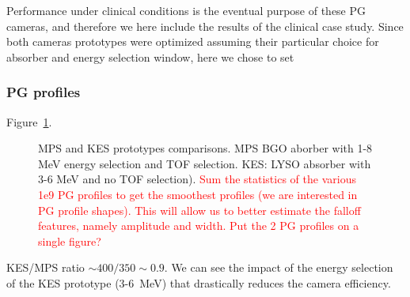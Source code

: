 \documentclass[a4paper,english]{article}
\begin{document}
Performance under clinical conditions is the eventual purpose of these PG cameras, and therefore we here include the results of the clinical case study. Since both cameras prototypes were optimized assuming their particular choice for absorber and energy selection window, here we chose to set 

\subsubsection{PG profiles}

Figure~\ref{PGprofileProtoComp}.

\begin{figure}[!htp]
  \centering
  \quad
  \caption{\label{PGprofileProtoComp} MPS and KES prototypes comparisons. MPS BGO aborber with 1-8 MeV energy selection and TOF selection. KES: LYSO absorber with 3-6 MeV and no TOF selection). \textcolor{red}{Sum the statistics of the various 1e9 PG profiles to get the smoothest profiles (we are interested in PG profile shapes). This will allow us to better estimate the falloff features, namely amplitude and width. Put the 2 PG profiles on a single figure?}}
\end{figure}  

KES/MPS ratio $\sim 400/350 \sim 0.9$. We can see the impact of the energy selection of the KES prototype (3-6~MeV) that drastically reduces the camera efficiency.
\end{document}
